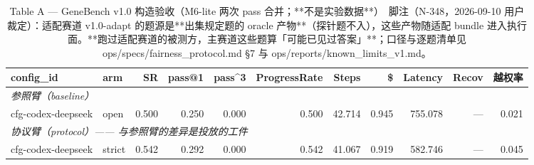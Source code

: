 \begin{table}[t]
\centering
\caption{Table A — GeneBench v1.0 构造验收（M6-lite 两次 pass 合并；**不是实验数据**）　脚注（N-348，2026-09-10 用户裁定）：适配赛道 v1.0-adapt 的题源是**出集规定题的 oracle 产物**（探针题不入），这些产物随适配 bundle 进入执行面。**跑过适配赛道的被测方，主赛道这些题算「可能已见过答案」**；口径与逐题清单见 ops/specs/fairness\_protocol.md §7 与 ops/reports/known\_limits\_v1.md。}
\label{tab:a-m6-all}
\begin{tabular}{llrrrrrrrrr}
\toprule
config\_id & arm & SR & pass@1 & pass\^{}3 & ProgressRate & Steps & \$ & Latency & Recov & 越权率 \\
\midrule
\multicolumn{11}{l}{\textit{参照臂（baseline）}} \\
cfg-codex-deepseek & open & 0.500 & 0.250 & 0.000 & 0.500 & 42.714 & 0.945 & 755.078 & --- & 0.021 \\
\midrule
\multicolumn{11}{l}{\textit{协议臂（protocol）—— 与参照臂的差异是投放的工件}} \\
cfg-codex-deepseek & strict & 0.542 & 0.292 & 0.000 & 0.542 & 41.067 & 0.919 & 582.746 & --- & 0.045 \\
\bottomrule
\end{tabular}
\end{table}

